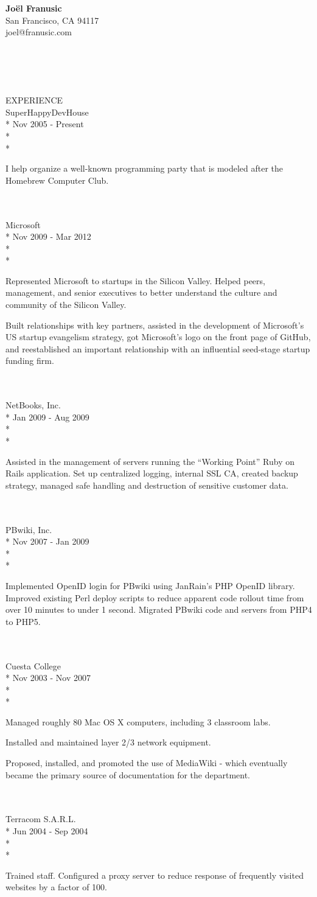 \documentclass[10pt]{article}
\newcommand{\work}[5]{
#1\\*
#2\\*
\\*
\makebox[1in][l]{}
\begin{minipage}[t]{5.50in}\small{#5}\end{minipage}
\\
\\
}
\newcommand{\heading}[1]{
#1
\\
}
\newcommand{\address}[1]{
\hfill{}\begin{minipage}[t]{2.00in}#1\end{minipage}
\\
}
\begin{document}
\address{\textbf{Jo\"el Franusic}\\ San Francisco, CA 94117\\ joel@franusic.com}
\\
\\
\\
\heading{EXPERIENCE}

\work{SuperHappyDevHouse}{Nov 2005 - Present}{Bay Area, California}{Co-organizer}{
I help organize a well-known programming party that is modeled after the Homebrew Computer Club.
}

\work{Microsoft}{Nov 2009 - Mar 2012}{Silicon Valley, California}{Startup Developer Evangelist}{

Represented Microsoft to startups in the Silicon Valley.
Helped peers, management, and senior executives to better understand the culture and community of the Silicon Valley.

Built relationships with key partners, 
assisted in the development of Microsoft's US startup evangelism strategy, 
got Microsoft's logo on the front page of GitHub, 
and reestablished an important relationship with an influential seed-stage startup funding firm.
}

\work{NetBooks, Inc.}{Jan 2009 - Aug 2009}{San Francisco, California}{System Administrator}{
Assisted in the management of servers running the ``Working Point''
Ruby on Rails application.  Set up centralized logging, internal SSL
CA, created backup strategy, managed safe handling and destruction of
sensitive customer data.
}

\work{PBwiki, Inc.}{Nov 2007 - Jan 2009}{San Mateo, California}{Systems Engineer}{
Implemented OpenID login for PBwiki using JanRain's PHP OpenID library.
Improved existing Perl deploy scripts to reduce apparent code rollout time from over 10 minutes to under 1 second.
Migrated PBwiki code and servers from PHP4 to PHP5.
}

\work{Cuesta College}{Nov 2003 - Nov 2007}{San Luis Obispo, California}{Network Technician}{
Managed roughly 80 Mac OS X computers, including 3 classroom labs.

Installed and maintained layer 2/3 network equipment.

Proposed, installed, and promoted the use of MediaWiki - which eventually became the primary source of documentation for the department.
}

\work{Terracom S.A.R.L.}{Jun 2004 - Sep 2004}{Kigali, Rwanda}{Consultant}{
Trained staff. Configured a proxy server to reduce response of
frequently visited websites by a factor of 100.}


\end{document}
